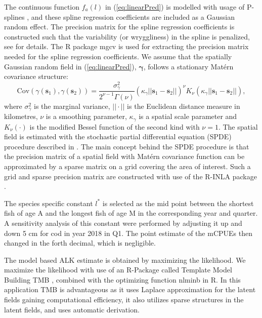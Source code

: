 \documentclass[a4paper 12pt]{article}
\numberwithin{equation}{section}
\begin{document}
The continuous function $f_a(l)$ in (\ref{eq:linearPred}) is modelled with usage of P-splines \citep{wood2017generalized}, and these spline regression coefficients are included as a Gaussian random effect. The precision matrix for the spline regression coefficients is constructed such that the variability (or wryggliness) in the spline is penalized, see \citet[page 239]{wood2017generalized} for details. The R package mgcv \citep{wood2015package} is used for extracting the precision matrix needed for the spline regression coefficients. We assume that the spatially Gaussian random field in (\ref{eq:linearPred}), $\pmb{\gamma}$, follows a stationary Mat\'{e}rn covariance structure:
\begin{equation}\label{eq:matern}
 \text{Cov}(\gamma(\mathbf{s}_1),\gamma(\mathbf{s}_2)) = \frac{\sigma^2_{\gamma}}{2^{\nu-1}\Gamma(\nu)}(\kappa_{\gamma}||\mathbf{s}_1 -\mathbf{s}_2||)^{\nu}K_{\nu}(\kappa_{\gamma}||\mathbf{s}_1-\mathbf{s}_2||),
\end{equation}
where $\sigma^2_{\gamma}$ is the marginal variance, $||\cdot||$ is the Euclidean distance measure in kilometres, $\nu$ is a smoothing parameter, $\kappa_{\gamma}$ is a spatial scale parameter and $K_{\nu}(\cdot)$ is the modified Bessel function of the second kind with $\nu = 1$. The spatial field is estimated with the stochastic partial differential equation (SPDE) procedure described in \citet{lindgren2011explicit}. The main concept behind the SPDE procedure is that the precision matrix of a spatial field with Mat\'{e}rn  covariance function can be approximated by a sparse matrix on a grid covering the area of interest. Such a grid and sparse precision matrix are constructed with use of the R-INLA package \citep{rue2009approximate}.

The species specific constant $l^*$ is selected as the mid point between the shortest fish of age A and the longest fish of age M in the corresponding year and quarter. A sensitivity analysis of this constant were performed by adjusting it up and down 5 cm for cod in year 2018 in Q1. The point estimate of the mCPUEs then changed in the forth decimal, which is negligible.

The model based ALK estimate is obtained by maximizing the likelihood. We maximize the likelihood with use of an R-Package called Template Model Building {\sffamily TMB} \citep{kristensen2015tmb}, combined with the optimizing function {\sffamily nlminb} in R. In this application {\sffamily TMB} is advantageous as it uses Laplace approximation for the latent fields gaining computational efficiency, it also utilizes sparse structures in the latent fields, and uses automatic derivation. 
\end{document}
